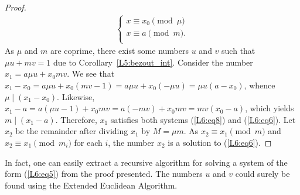 \documentclass[12pt,notitlepage]{article}
\theoremstyle{plain}
\theoremstyle{definition}
\theoremstyle{plain}
\newcommand{\1}{\mathbf{1}}
\newcommand{\0}{\mathbf{0}}
\newcommand{\dvd}{\mathop{\mid}}
\begin{document}
\begin{proof}
\begin{equation}\label{L6:eq8}
\begin{array}{l}
\begin{cases}
	 x \equiv x_0 \pmod {\mu}\\
	 x \equiv a \pmod {m}.\\
\end{cases}
\end{array}
\end{equation}
As $\mu$ and $m$ are coprime, there exist some numbers $u$ and $v$ such that $\mu u + m v = 1$ due to Corollary~\ref{L5:bezout_int}. Consider the number $x_1 = a \mu u + x_0 m v$. We see that $x_1 - x_0 = a \mu u + x_0 (mv - 1) = a \mu u + x_0 (- \mu u) = \mu u (a - x_0)$, whence $\mu \dvd (x_1 - x_0)$. Likewise, $x_1 - a= a (\mu u - 1)  + x_0mv = a (- m v) + x_0mv = m v (x_0 - a)$, which yields $m \dvd (x_1 - a)$. Therefore, $x_1$ satisfies both systems (\ref{L6:eq8}) and (\ref{L6:eq6}). Let $x_2$ be the remainder after dividing $x_1$ by $M = \mu m$. As $x_2 \equiv x_1 \pmod m$ and $x_2 \equiv x_1 \pmod {m_i}$ for each $i$, the number $x_2$ is a solution to (\ref{L6:eq6}).
\end{proof}

In fact, one can easily extract a recursive algorithm for solving a system of the form (\ref{L6:eq5}) from the proof presented. The numbers $u$ and $v$ could surely be found using the Extended Euclidean Algorithm.
\end{document}
